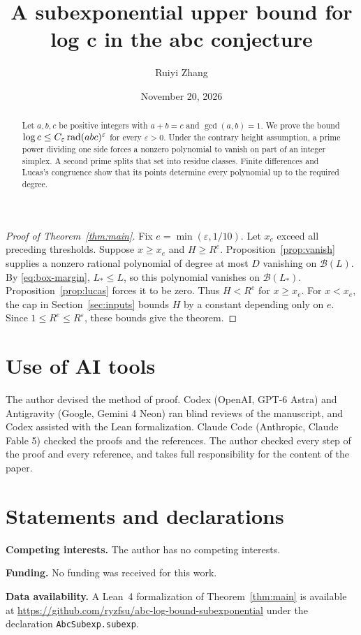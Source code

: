 \documentclass[11pt]{amsart}
\title[A subexponential upper bound for log c]{A subexponential upper bound for log c in the abc conjecture}
\author{Ruiyi Zhang}
\date{November 20, 2026}
\numberwithin{equation}{section}
\begin{document}
\begin{abstract}
Let \(a,b,c\) be positive integers with \(a+b=c\) and \(\gcd(a,b)=1\).
We prove the bound
\(\log c\le C_\varepsilon\operatorname{rad}(abc)^\varepsilon\) for every
\(\varepsilon>0\). Under the contrary height assumption, a prime power
dividing one side forces a nonzero polynomial to vanish on part of an
integer simplex. A second prime splits that set into residue classes.
Finite differences and Lucas's congruence show that its points determine
every polynomial up to the required degree.
\end{abstract}
\maketitle







\begin{proof}[Proof of Theorem~\ref{thm:main}]
Fix \(e=\min(\varepsilon,1/10)\). Let \(x_e\) exceed all preceding thresholds.
Suppose \(x\ge x_e\) and \(H\ge R^e\).
Proposition~\ref{prop:vanish} supplies a nonzero rational polynomial of
degree at most \(D\) vanishing on \(\mathcal B(L)\).
By \eqref{eq:box-margin}, \(L_*\le L\), so this polynomial vanishes on
\(\mathcal B(L_*)\). Proposition~\ref{prop:lucas} forces it to be zero.
Thus \(H<R^e\) for \(x\ge x_e\). For \(x<x_e\),
the cap in Section~\ref{sec:inputs} bounds \(H\) by a constant depending only on \(e\).
Since \(1\le R^e\le R^\varepsilon\), these bounds give the theorem.
\end{proof}
\section*{Use of AI tools}
The author devised the method of proof. Codex (OpenAI, GPT-6 Astra) and
Antigravity (Google, Gemini 4 Neon) ran blind reviews of the manuscript,
and Codex assisted with the Lean formalization. Claude Code (Anthropic,
Claude Fable 5) checked the proofs and the references. The author checked
every step of the proof and every reference, and takes full responsibility
for the content of the paper.

\section*{Statements and declarations}
{\raggedright
\textbf{Competing interests.} The author has no competing interests.\par
\textbf{Funding.} No funding was received for this work.\par
\textbf{Data availability.} A Lean~4 formalization of Theorem~\ref{thm:main}
is available at \url{https://github.com/ryzfsu/abc-log-bound-subexponential}
under the declaration \texttt{AbcSubexp.subexp}.\par}

\end{document}
